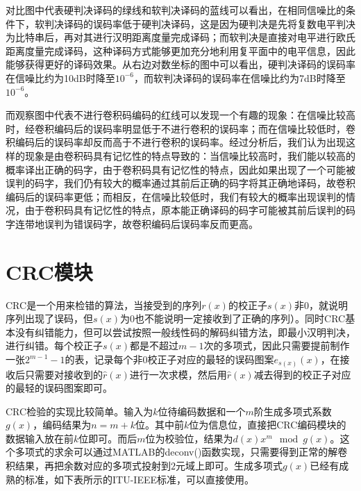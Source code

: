 对比图中代表硬判决译码的绿线和软判决译码的蓝线可以看出，在相同信噪比的条件下，软判决译码的误码率低于硬判决译码，这是因为硬判决是先将复数电平判决为比特串后，再对其进行汉明距离度量完成译码；而软判决是直接对电平进行欧氏距离度量完成译码，这种译码方式能够更加充分地利用复平面中的电平信息，因此能够获得更好的译码效果。从右边对数坐标的图中可以看出，硬判决译码的误码率在信噪比约为10dB时降至$10^{-6}$，而软判决译码的误码率在信噪比约为7dB时降至$10^{-6}$。

而观察图中代表不进行卷积码编码的红线可以发现一个有趣的现象：在信噪比较高时，经卷积编码后的误码率明显低于不进行卷积的误码率；而在信噪比较低时，卷积编码后的误码率却反而高于不进行卷积的误码率。经过分析后，我们认为出现这样的现象是由卷积码具有记忆性的特点导致的：当信噪比较高时，我们能以较高的概率译出正确的码字，由于卷积码具有记忆性的特点，因此如果出现了一个可能被误判的码字，我们仍有较大的概率通过其前后正确的码字将其正确地译码，故卷积编码后的误码率更低；而相反，在信噪比较低时，我们有较大的概率出现误判的情况，由于卷积码具有记忆性的特点，原本能正确译码的码字可能被其前后误判的码字连带地误判为错误码字，故卷积编码后误码率反而更高。

\section{CRC模块}

CRC是一个用来检错的算法，当接受到的序列$r(x)$的校正子$s(x)$非$0$，就说明序列出现了误码，但$s(x)$为$0$也不能说明一定接收到了正确的序列）。同时CRC基本没有纠错能力，但可以尝试按照一般线性码的解码纠错方法，即最小汉明判决，进行纠错。每个校正子$s(x)$都是不超过$m-1$次的多项式，因此只需要提前制作一张$2^{m-1}-1$的表，记录每个非$0$校正子对应的最轻的误码图案$e_{s(x)}(x)$，在接收后只需要对接收到的$\hat{r}(x)$进行一次求模，然后用$\hat{r}(x)$减去得到的校正子对应的最轻的误码图案即可。	
	
CRC检验的实现比较简单。输入为$k$位待编码数据和一个$m$阶生成多项式系数$g(x)$，编码结果为$n=m+k$位。其中前$k$位为信息位，直接把CRC编码模块的数据输入放在前$k$位即可。而后$m$位为校验位，结果为$d(x)x^m \mod g(x)$。这个多项式的求余可以通过MATLAB的deconv()函数实现，只需要得到正常的解卷积结果，再把余数对应的多项式投射到$2$元域上即可。生成多项式$g(x)$已经有成熟的标准，如下表所示的ITU-IEEE标准，可以直接使用。

